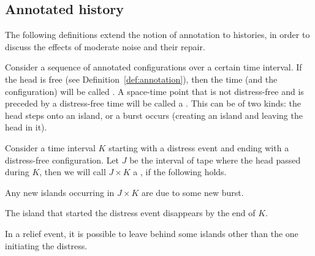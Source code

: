 \documentclass[11pt]{memoir}
\theoremstyle{definition} %
\newcommand{\Z}{Z}
\begin{document}
\subsection{Annotated history}

The following definitions extend the notion of annotation to histories,
in order to discuss the effects of moderate noise and their repair.


\begin{definition}\label{def:distress}
Consider a sequence of annotated configurations over a certain time interval.
If the head is free (see Definition~\ref{def:annotation}), then
the time (and the configuration) will be called .
A space-time point that is not distress-free and is preceded by
a distress-free time will be called a .
This can be of two kinds: the head steps onto an island, or a burst occurs
(creating an island and leaving the head in it).


Consider a time interval \( K \) starting with a distress event and
ending with a distress-free configuration.
Let \( J \) be the interval of tape where the head passed during \( K \), then 
we will call \( J\times K \) a , if the following holds.

\begin{alphenumIn}
\item Any new islands occurring in \( J \times K \) are due to some new burst.
\item The island that started the distress event disappears by the end of \( K \).
\end{alphenumIn}
\end{definition}

In a relief event, it is possible to leave behind some islands other than the one initiating the distress.
\end{document}
